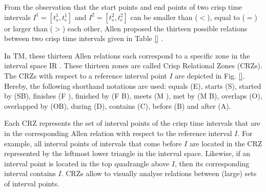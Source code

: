 
From the observation that the start points and end points of two crisp time intervals $I^{1} = \left[t_s^1, t_e^1 \right]$ and $I^2 = \left[t_s^2, t_e^2 \right]$ can be smaller than ($<$), equal to ($=$) or larger than ($>$) each other, Allen proposed the thirteen possible relations between two crisp time intervals given in Table \ref{} \cite{Allen1983}.

In TM, these thirteen Allen relations each correspond to a specific zone in the interval space IR \cite{Kulpa1997}. These thirteen zones are called Crisp Relational Zones (CRZs). The CRZs with respect to a reference interval point $I$ are depicted in Fig. \ref{}. Hereby, the following shorthand notations are used: equals (E), starts (S), started by (SB), finishes (F ), finished by (F B), meets (M ), met by (M B), overlaps (O), overlapped by (OB), during (D), contains (C), before (B) and after (A).

% 

Each CRZ represents the set of interval points of the crisp time intervals that are in the corresponding Allen relation with respect to the reference interval $I$. For example, all interval points of intervals that come before $I$ are located in the CRZ represented by the leftmost lower triangle in the interval space. Likewise, if an interval point is located in the top quadrangle above $I$, then its corresponding interval contains $I$. CRZs allow to visually analyse relations between (large) sets of interval points.
